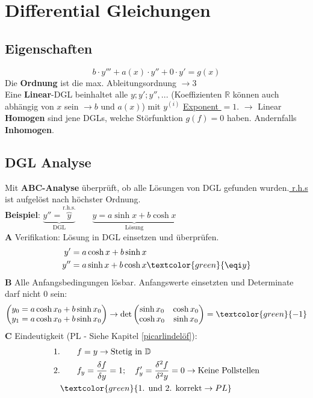 \section{Differential Gleichungen}
\subsection{Eigenschaften}
\[
b\cdot y''' + a(x) \cdot y'' + 0 \cdot y' = g(x)
\]
Die \textbf{Ordnung} ist die max. Ableitungsordnung $\to 3$ \\
Eine \textbf{Linear}-DGL beinhaltet alle $y;y';y'',...$ (Koeffizienten $\mathbb{R}$ können auch abhängig von $x$ sein $\to b \text{ und } a(x)$) mit $y^{(i)}$ \underline{Exponent $=1$}. $\to $ Linear \\
\textbf{Homogen} sind jene DGLs, welche Störfunktion $g(f) = 0$ haben. Andernfalls \textbf{Inhomogen}.


\subsection{DGL Analyse}
Mit \textbf{ABC-Analyse} überprüft, ob alle Lösungen von DGL gefunden wurden.\underline{ r.h.s} ist aufgelöst nach höchster Ordnung.\\

\noindent\textbf{Beispiel}:
$\underbrace{y'' = \overbrace{y}^\text{r.h.s.}}_\text{DGL} \qquad	\underbrace{y = a\sinh x + b\cosh x}_\text{Lösung}$\\
\textbf{A} Verifikation: Lösung in DGL einsetzen und überprüfen.
\begin{align*}
	y' &= a\cosh x + b\sinh x \\
	y'' &= a\sinh x + b\cosh x \textcolor{green}{ \eqi y}
\end{align*}
\textbf{B} Alle Anfangsbedingungen lösbar. Anfangswerte einsetzten und Determinate darf nicht $0$ sein: 
\begin{align*}
	\begin{pmatrix}
	y_0 = a\cosh x_0 + b\sinh x_0 \\
	y_1 = a\cosh x_0 + b\sinh x_0
	\end{pmatrix}
	\rightarrow
	\det\begin{pmatrix}
		\sinh x_0 & \cosh x_0 \\
		\cosh x_0 & \sinh x_0
	\end{pmatrix} = \textcolor{green}{ -1}
\end{align*}
\textbf{C} Eindeutigkeit (PL - Siehe Kapitel \ref{picarlindelöf}): \label{picarlindelöf_beispiel}
\begin{align*}
	1. &\qquad f = y \to \text{Stetig in } \mathbb{D} \\
	2. &\qquad f_y = \frac{\delta f}{\delta y} = 1 ;\quad  f'_y = \frac{\delta^2 f}{\delta^2 y} = 0 \to \text{Keine Pollstellen}\\
	&\textcolor{green}{ \text{1. und 2. korrekt} \to PL}
\end{align*}

